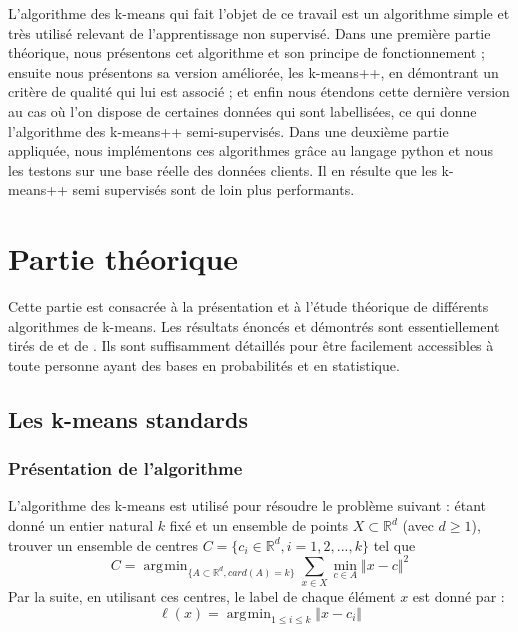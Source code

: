 \documentclass[12pt,a4paper]{book}
\newcommand{\R}{\mathbb{R}}
\newcommand{\1}{\mathds{1}}
\DeclareMathOperator*{\argmin}{arg\!\min}
\begin{document}
L'algorithme des k-means qui fait l'objet de ce travail est un algorithme simple et très utilisé relevant de l'apprentissage non supervisé. Dans une première partie théorique, nous présentons cet algorithme et son principe de fonctionnement ; ensuite nous présentons sa version améliorée, les k-means++, en démontrant un critère de qualité qui lui est associé ; et enfin nous étendons cette dernière version au cas où l'on dispose de certaines données qui sont labellisées, ce qui donne l'algorithme des k-means++ semi-supervisés. Dans une deuxième partie appliquée, nous implémentons ces algorithmes grâce au langage python et nous les testons sur une base réelle des données clients. Il en résulte que les k-means++ semi supervisés sont de loin plus performants.





\section{Partie théorique}

Cette partie est consacrée à la présentation et à l'étude théorique de différents algorithmes de k-means. Les  résultats énoncés et démontrés sont essentiellement tirés de \cite{DAV2007} et de \cite{JOR2017}. Ils sont suffisamment détaillés pour être facilement accessibles à toute personne ayant des bases en probabilités et en statistique.

\subsection{Les k-means standards}

\subsubsection{Présentation de l'algorithme}

L'algorithme des k-means est utilisé pour résoudre le problème suivant : étant donné un entier natural $k$ fixé et un ensemble de points $X \subset \R^d$ (avec $d \geq 1$), trouver un ensemble de centres $C = \{ c_i \in \R^d, i=1,2,...,k \}$ tel que 
\begin{equation}\label{probleme_kmeans}
	C = \argmin_{\{ A \subset \R^d, card(A)=k \}}\sum_{x \in X} \min_{c \in A} \Vert x-c \Vert^2
\end{equation}
Par la suite, en utilisant ces centres, le label de chaque élément $x$ est donné par :
$$
	\ell (x) = \argmin_{1 \leq i \leq k} \Vert x - c_i \Vert
$$
\end{document}
